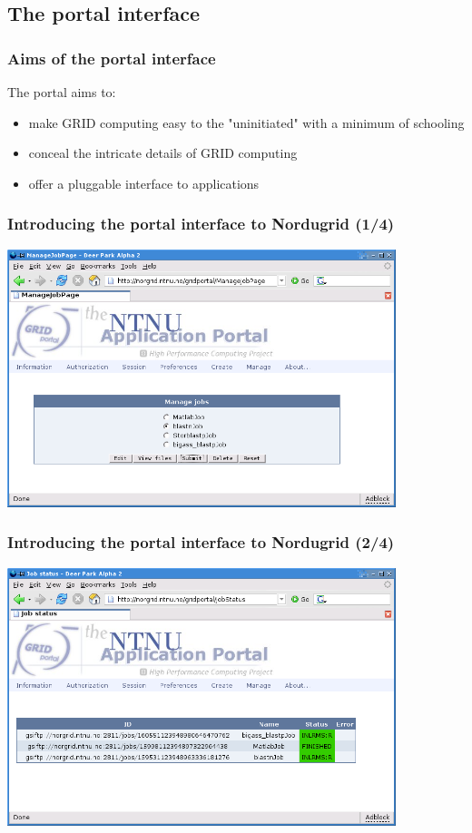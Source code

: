 \documentclass{beamer}
\begin{document}
\subsection{The portal interface}

\begin{frame}
  \frametitle{Aims of the portal interface}

	The portal aims to:
  \begin{itemize}
  	\item make GRID computing easy to the "uninitiated" with a minimum of schooling
  	\item conceal the intricate details of GRID computing
  	\item offer a pluggable interface to applications
  \end{itemize}
\end{frame}

\begin{frame}
  \frametitle{Introducing the portal interface to Nordugrid (1/4)}

	\begin{center}
		\includegraphics[width=0.85\textwidth]{portal_submit.png}
	\end{center}
\end{frame}

\begin{frame}
  \frametitle{Introducing the portal interface to Nordugrid (2/4)}

	\begin{center}
		\includegraphics[width=0.85\textwidth]{portal_monitor.png}
	\end{center}	
\end{frame}
\end{document}
